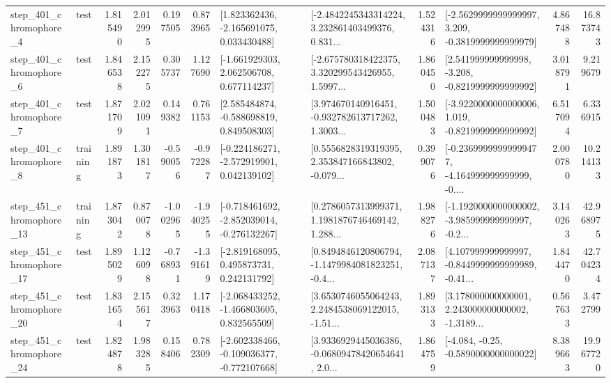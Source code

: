 \begin{tabular}{llrrrrllrlrr}
   step\_401\_chromophore\_4 &      test &      1.815490 &    2.012995 &      0.197505 &  0.873965 &    [1.823362436, -2.165691075, 0.033430488] &  [-2.4842245343314224, 3.232861403499376, 0.831... &       1.524316 &  [-2.5629999999999997, 3.209, -0.3819999999999979] &            4.867488 &         16.873743 \\
   step\_401\_chromophore\_6 &      test &      1.846538 &    2.152275 &      0.305737 &  1.127690 &    [-1.661929303, 2.062506708, 0.677114237] &  [-2.675780318422375, 3.320299543426955, 1.5997... &       1.860450 &   [2.541999999999998, -3.208, -0.8219999999999992] &            3.018791 &          9.219679 \\
   step\_401\_chromophore\_7 &      test &      1.871709 &    2.021091 &      0.149382 &  0.761153 &    [2.585484874, -0.588698819, 0.849508303] &  [3.974670140916451, -0.932782613717262, 1.3003... &       1.500483 &  [-3.9220000000000006, 1.019, -0.8219999999999992] &            6.517094 &          6.336915 \\
   step\_401\_chromophore\_8 &  training &      1.891873 &    1.301817 &     -0.590056 & -0.972287 &   [-0.224186271, -2.572919901, 0.042139102] &  [0.5556828319319395, 2.353847166843802, -0.079... &       0.399076 &  [-0.23699999999999477, -4.164999999999999, -0.... &            2.000780 &         10.214133 \\
  step\_451\_chromophore\_13 &  training &      1.873042 &    0.870078 &     -1.002965 & -1.940255 &  [-0.718461692, -2.852039014, -0.276132267] &  [0.2786057313999371, 1.1981876746469142, 1.288... &       1.988276 &  [-1.1920000000000002, -3.985999999999997, -0.2... &            3.140263 &         42.968975 \\
  step\_451\_chromophore\_17 &      test &      1.895029 &    1.126098 &     -0.768931 & -1.391619 &    [-2.819168095, 0.495873731, 0.242131792] &  [0.8494846120806794, -1.1479984081823251, -0.4... &       2.087137 &  [4.107999999999997, -0.8449999999999989, -0.41... &            1.844470 &         42.704234 \\
  step\_451\_chromophore\_20 &      test &      1.831654 &    2.155617 &      0.323963 &  1.170418 &   [-2.068433252, -1.466803605, 0.832565509] &  [3.6530746055064243, 2.2484538069122015, -1.51... &       1.893133 &  [3.178000000000001, 2.243000000000002, -1.3189... &            0.567633 &          3.472799 \\
  step\_451\_chromophore\_24 &      test &      1.824878 &    1.983285 &      0.158406 &  0.782309 &  [-2.602338466, -0.109036377, -0.772107668] &  [3.9336929445036386, -0.06809478420654641, 2.0... &       1.864759 &               [-4.084, -0.25, -0.5890000000000022] &            8.389663 &         19.967720 \\

\end{tabular}
